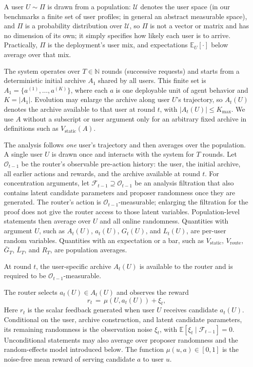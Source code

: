 \documentclass{article} %
\providecommand{\E}{\mathbb{E}}
\begin{document}
A user $U \sim \Pi$ is drawn from a population: $\mathcal{U}$ denotes the user space (in our benchmarks a finite set of user profiles; in general an abstract measurable space), and $\Pi$ is a probability distribution over $\mathcal{U}$, so $\Pi$ is not a vector or matrix and has no dimension of its own; it simply specifies how likely each user is to arrive. Practically, $\Pi$ is the deployment's user mix, and expectations $\E_U[\cdot]$ below average over that mix.

The system operates over $T \in \mathbb{N}$ rounds (successive requests) and starts from a deterministic initial archive $A_1$ shared by all users. This finite set is $A_1 = \{a^{(1)}, \dots, a^{(K)}\}$, where each $a$ is one deployable unit of agent behavior and $K = |A_1|$. Evolution may enlarge the archive along user $U$'s trajectory, so $A_t(U)$ denotes the archive available to that user at round $t$, with $|A_t(U)| \leq K_{\max}$. We use $A$ without a subscript or user argument only for an arbitrary fixed archive in definitions such as $V_{\mathrm{static}}(A)$.

The analysis follows \emph{one} user's trajectory and then averages over the population. A single user \(U\) is drawn once and interacts with the system for \(T\) rounds. Let \(\mathcal O_{t-1}\) be the router's observable pre-action history: the user, the initial archive, all earlier actions and rewards, and the archive available at round \(t\). For concentration arguments, let \(\mathcal F_{t-1}\supseteq\mathcal O_{t-1}\) be an analysis filtration that also contains latent candidate parameters and proposer randomness once they are generated. The router's action is \(\mathcal O_{t-1}\)-measurable; enlarging the filtration for the proof does not give the router access to those latent variables. Population-level statements then average over \(U\) and all online randomness. Quantities with argument \(U\), such as \(A_t(U)\), \(a_t(U)\), \(G_t(U)\), and \(L_t(U)\), are per-user random variables.  Quantities with an expectation or a bar, such as \(V_{\mathrm{static}}\), \(V_{\mathrm{route}}\), \(\bar G_T\), \(\bar L_T\), and \(R_T\), are population averages.

At round $t$, the user-specific archive $A_t(U)$ is available to the router and is required to be $\mathcal{O}_{t-1}$-measurable.

The router selects $a_t(U) \in A_t(U)$ and observes the reward
\[
r_t \,=\, \mu(U, a_t(U)) + \xi_t ,
\]
Here \(r_t\) is the scalar feedback generated when user \(U\) receives candidate \(a_t(U)\). Conditional on the user, archive construction, and latent candidate parameters, its remaining randomness is the observation noise \(\xi_t\), with \(\E[\xi_t\mid\mathcal F_{t-1}]=0\). Unconditional statements may also average over proposer randomness and the random-effects model introduced below. The function \(\mu(u,a)\in[0,1]\) is the noise-free mean reward of serving candidate \(a\) to user \(u\).
\end{document}
